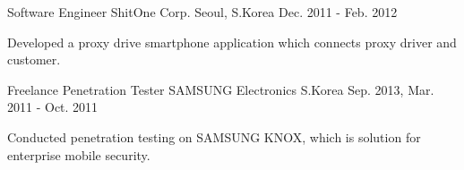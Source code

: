 \begin{cventries}
  \cventry
    {Software Engineer} %
    {ShitOne Corp.} %
    {Seoul, S.Korea} %
    {Dec. 2011 - Feb. 2012} %
    {
      \begin{cvitems} %
        \item {Developed a proxy drive smartphone application which connects proxy driver and customer.}
      \end{cvitems}
    }

  \cventry
    {Freelance Penetration Tester} %
    {SAMSUNG Electronics} %
    {S.Korea} %
    {Sep. 2013, Mar. 2011 - Oct. 2011} %
    {
      \begin{cvitems} %
        \item {Conducted penetration testing on SAMSUNG KNOX, which is solution for enterprise mobile security.}
      \end{cvitems}
    }

\end{cventries}
